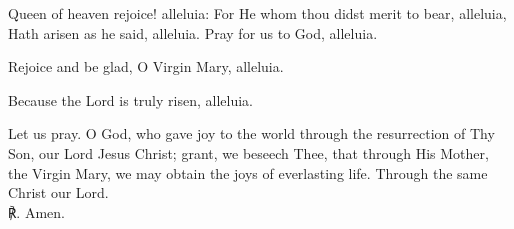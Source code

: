 \begin{otherlanguage}{english}\noindent Queen of heaven rejoice! alleluia:
For He whom thou didst merit to bear, alleluia,
Hath arisen as he said, alleluia.
Pray for us to God, alleluia.

\noindent \vv Rejoice and be glad, O Virgin Mary, alleluia.

\noindent \rr Because the Lord is truly risen, alleluia.

\noindent Let us pray. O God, who gave joy to the world through the resurrection of Thy Son, our Lord Jesus Christ; grant, we beseech Thee, that through His Mother, the Virgin Mary, we may obtain the joys of everlasting life. Through the same Christ our Lord. \\ ℟. Amen.
\end{otherlanguage}